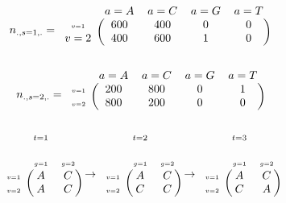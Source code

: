 \documentclass{beamer}
\begin{document}
\begin{frame}
    $$n_{.,s=1,.}=\begin{blockarray}{ccccc}
    &a=A&a=C&a=G&a=T&\\
    \begin{block}{c(cccc)}
 {\scriptscriptstyle v=1}&600&400&0&0\\   
 v=2&400&600&1&0\\
    \end{block}
\end{blockarray} $$


$$n_{.,s=2,.}=\begin{blockarray}{ccccc}
    &a=A&a=C&a=G&a=T&\\
    \begin{block}{c(cccc)}
{\scriptscriptstyle v=1}&200&800&0&1\\   
  {\scriptscriptstyle v=2}&800&200&0&0\\
    \end{block}
\end{blockarray} $$

$$\overset{t=1}{\begin{blockarray}{ccc}
    &&\\&\scriptscriptstyle g=1&\scriptscriptstyle g=2\\
    \begin{block}{c(cc)}
 {\scriptscriptstyle v=1}&A&C\\   
  {\scriptscriptstyle v=2}&A&C\\   
    \end{block}
\end{blockarray}} \to \overset{t=2}{\begin{blockarray}{ccc}
    &&\\&\scriptscriptstyle g=1&\scriptscriptstyle g=2\\
    \begin{block}{c(cc)}
 {\scriptscriptstyle v=1}&A&C\\   
  {\scriptscriptstyle v=2}&C&C\\   
    \end{block}
\end{blockarray}} \to \overset{t=3}{\begin{blockarray}{ccc}
    &&\\&\scriptscriptstyle g=1&\scriptscriptstyle g=2\\
    \begin{block}{c(cc)}
 {\scriptscriptstyle v=1}&A&C\\   
  {\scriptscriptstyle v=2}&C&A\\   
    \end{block}
\end{blockarray}}$$
\end{frame}
\end{document}
